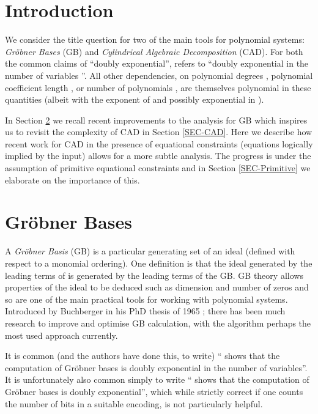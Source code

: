 \documentclass{llncs}
\begin{document}
\section{Introduction}
\label{SEC-Intro}

We consider the title question for two of the main tools for polynomial systems: \emph{Gr\"obner Bases} (GB) and \emph{Cylindrical Algebraic Decomposition} (CAD).  For both the common claims of ``doubly exponential'', refers to ``doubly exponential in the number of variables ''.  All other dependencies, on polynomial degrees , polynomial coefficient length , or number of polynomials , are themselves polynomial in these quantities (albeit with the exponent of  and  possibly exponential in ).  

In Section \ref{SEC-GB} we recall recent improvements to the analysis for GB which inspires us to revisit the complexity of CAD in Section \ref{SEC-CAD}.  Here we describe how recent work for CAD in the presence of equational constraints (equations logically implied by the input) allows for a more subtle analysis. The progress is under the assumption of primitive equational constraints and in Section \ref{SEC-Primitive} we elaborate on the importance of this.

\section{Gr\"obner Bases}
\label{SEC-GB}

A \emph{Gr\"{o}bner Basis} (GB) is a particular generating set of an ideal  (defined with respect to a monomial ordering).  One definition is that the ideal generated by the leading terms of  is generated by the leading terms of the GB.  GB theory allows properties of the ideal to be deduced such as dimension and number of zeros and so are one of the main practical tools for working with polynomial systems.  Introduced by Buchberger in his PhD thesis of 1965 \cite{Buchberger2006}; there has been much research to improve and optimise GB calculation, with the  algorithm \cite{Faugere2002} perhaps the most used approach currently. 

It is common (and the authors have done this, to write) ``\cite{MM82} shows that the computation of Gr\"obner bases is doubly exponential in the number of variables''.  It is unfortunately also common simply to write ``\cite{MM82} shows that the computation of Gr\"obner bases is doubly exponential'', which while strictly correct if one counts the number of bits in a suitable encoding, is not particularly helpful.
\end{document}

